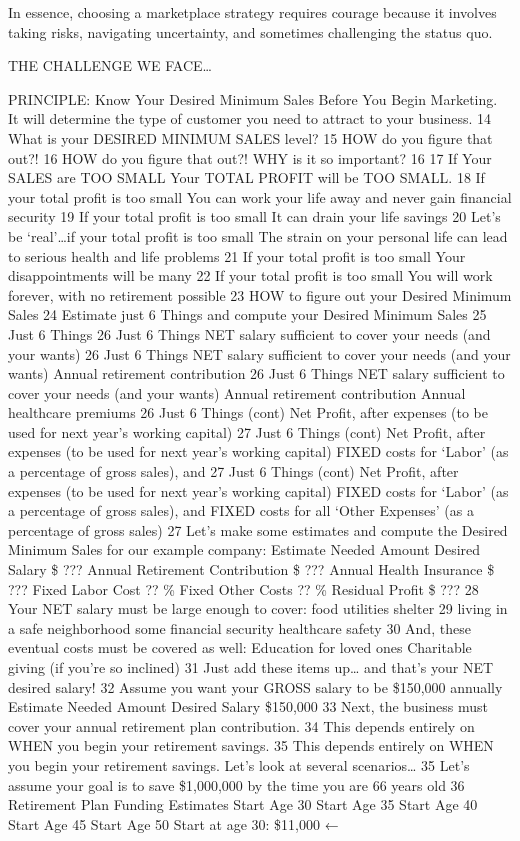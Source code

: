 \documentclass[
]{book}
\begin{document}
In essence, choosing a marketplace strategy requires courage because it involves taking risks, navigating uncertainty, and sometimes challenging the status quo.

THE CHALLENGE WE FACE\ldots{}

PRINCIPLE: Know Your Desired Minimum Sales Before You Begin Marketing. It will determine the type of customer you need to attract to your business.
14 What is your DESIRED
MINIMUM SALES level? 15 HOW do you figure that out?! 16 HOW do you figure that out?! WHY is it so important? 16 17 If Your SALES are TOO SMALL Your TOTAL PROFIT will be TOO SMALL. 18 If your total profit is too
small
You can work your life away
and never gain financial
security 19 If your total profit is too
small It can drain your life
savings 20 Let's be `real'\ldots if your total profit is too small
The strain on your personal life can lead to serious health and life
problems 21 If your total profit is too
small Your disappointments
will be many 22 If your total profit is too
small You will work forever,
with no retirement
possible 23 HOW to figure out your Desired Minimum Sales 24 Estimate just 6 Things and compute your Desired Minimum Sales 25 Just 6 Things 26 Just 6 Things
NET salary sufficient to cover your needs (and your wants) 26 Just 6 Things
NET salary sufficient to cover your needs (and your wants) Annual retirement contribution 26 Just 6 Things
NET salary sufficient to cover your needs (and your wants) Annual retirement contribution Annual healthcare premiums 26 Just 6 Things (cont)
Net Profit, after expenses (to be used for next year's working capital) 27 Just 6 Things (cont)
Net Profit, after expenses (to be used for next year's working capital) FIXED costs for `Labor' (as a percentage of gross sales), and 27 Just 6 Things (cont)
Net Profit, after expenses (to be used for next year's working capital) FIXED costs for `Labor' (as a percentage of gross sales), and FIXED costs for all `Other Expenses' (as a percentage of gross sales) 27 Let's make some estimates and compute the Desired Minimum Sales for our example company: Estimate Needed Amount Desired Salary \$ ??? Annual Retirement Contribution \$ ??? Annual Health Insurance \$ ??? Fixed Labor Cost ?? \% Fixed Other Costs ?? \% Residual Profit \$ ??? 28 Your NET salary must be large enough to cover: food utilities shelter 29 living in a safe
neighborhood some financial security healthcare safety 30 And, these eventual costs must be covered as well: Education for loved ones Charitable giving (if you're so inclined) 31 Just add these items up\ldots{}
and that's your NET desired salary! 32 Assume you want your GROSS salary to be \$150,000 annually Estimate Needed Amount Desired Salary \$150,000 33 Next, the business must cover your annual retirement plan contribution. 34 This depends entirely on WHEN you begin your retirement savings. 35 This depends entirely on WHEN you begin your retirement savings. Let's look at several scenarios\ldots{} 35 Let's assume your goal is to save \$1,000,000 by the time you are 66 years old 36 Retirement Plan Funding Estimates Start Age 30 Start Age 35 Start Age 40 Start Age 45 Start Age 50 Start at age 30: \$11,000 ←
\end{document}
